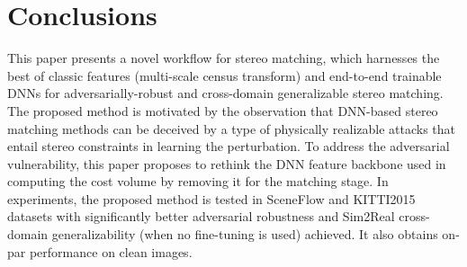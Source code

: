 \documentclass[10pt,twocolumn,letterpaper]{article}
\begin{document}
\begin{table}[ht]
\begin{center}
\end{center}
\caption{KITTI2015 leaderboard. FG: foreground regions.}
\label{table:kitti15_results_leaderboard}
\end{table}

\section{Conclusions}
This paper presents a novel workflow for stereo matching, which harnesses the best of classic features (multi-scale census transform) and end-to-end trainable DNNs for adversarially-robust and cross-domain generalizable stereo matching. The proposed method is motivated by the observation that DNN-based stereo matching methods can be deceived by a type of physically realizable attacks that entail stereo constraints in learning the perturbation. To address the adversarial vulnerability, this paper proposes to rethink the DNN feature backbone used in computing the cost volume by removing it for the matching stage. In experiments, the proposed method is tested in SceneFlow and KITTI2015 datasets with significantly better adversarial robustness and Sim2Real cross-domain generalizability (when no fine-tuning is used) achieved. It also obtains on-par performance on clean images. 



{\small


}
\end{document}
